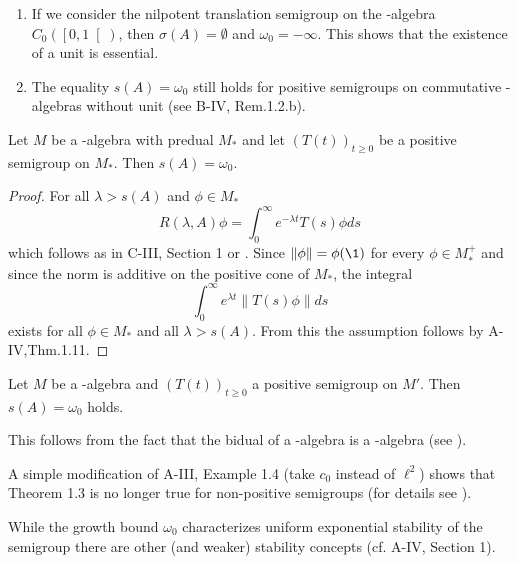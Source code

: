 \begin{remark}\label{rem:d4-1.2}
\begin{enumerate}
\item
If we consider the nilpotent translation semigroup on the \CA-algebra $C_{0}( \left[0,1\right[ )$, then $\sigma(A) = \emptyset$ and $\omega_{0} = -\infty$.
This shows that the existence of a unit is essential.

\item
The equality $s(A) = \omega_{0}$ still holds for positive semigroups on commutative \CA-algebras without unit (see B-IV, Rem.1.2.b).
\end{enumerate}
\end{remark}
\begin{theorem}\label{thm:d4-1.3}
Let $M$ be a \WA-algebra with predual $M_{*}$ and let $(T(t))_{t \geq 0}$ be a positive semigroup on $M_{*}$.
Then $s(A) = \omega_{0}$.
\end{theorem}
\begin{proof}
For all $\lambda > s(A)$ and $\phi \in M_{*}$
\[
R(\lambda,A)\phi = \int_{0}^{\infty} e^{-\lambda t}T(s)\phi ds
\]
which follows as in C-III, Section 1 or \citet[Theorem 3]{greinervoigtwolff:1981}.
Since $\|\phi\| = \phi(\1)$ for every $\phi \in M_{*}^{+}$ and since the norm is additive on the positive cone of $M_{*}$, the integral
\[
	\int_{0}^{\infty} e^{\lambda t}\|T(s)\phi\|ds
\]
exists for all $\phi \in M_{*}$ and all $\lambda > s(A)$.
From this the assumption follows by A-IV,Thm.1.11.
\end{proof}
\begin{corollary}\label{cor:d4-1.4}
Let $M$ be a \CA-algebra and $(T(t))_{t \geq 0}$ a positive semigroup on $M'$.
Then $s(A) = \omega_{0}$ holds.
\end{corollary}
\noindent This follows from the fact that the bidual of a \CA-algebra is a \WA-algebra (see \citet[Theorem III.2.4.]{takesaki:1979}).
\begin{remark}\label{rem:d4-1.5}
A simple modification of A-III, Example 1.4 (take $c_{0}$ instead of $\ell^2$) shows that Theorem 1.3 is no longer true for non-positive semigroups (for details see \citet[Beispiel 2.5]{grohneubrander:1981}).

While the growth bound $\omega_{0}$ characterizes uniform exponential stability of the semigroup there are other (and weaker) stability concepts (cf. A-IV, Section 1).
\end{remark}
